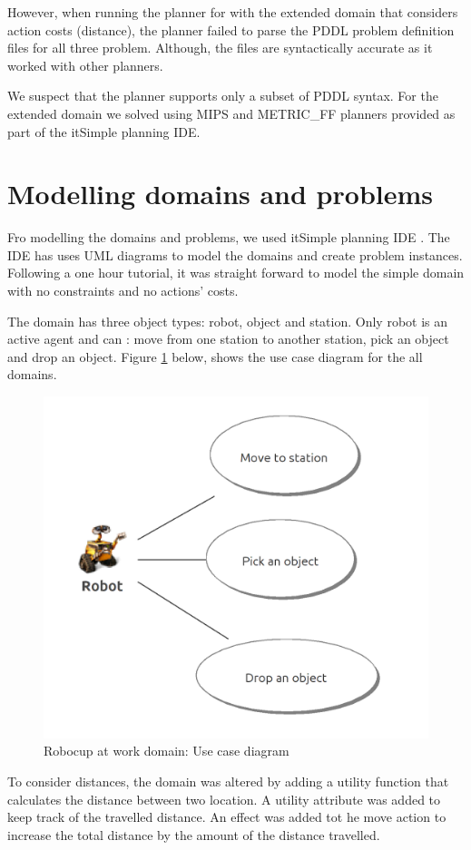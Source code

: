 \documentclass{article}
\begin{document}
However, when running the planner for with the extended domain that considers action costs (distance), the planner failed to parse the PDDL problem definition files for all three problem. Although, the files are syntactically accurate as it worked with other planners. 

We suspect that the planner supports only a subset of PDDL syntax. For the extended domain we solved using MIPS and METRIC\_FF planners provided as part of the itSimple planning IDE.
\section{Modelling domains and problems}
Fro modelling the domains and problems, we used itSimple planning IDE \cite{itsimple}. The IDE has uses UML diagrams to model the domains and create problem instances. Following a one hour tutorial, it was straight forward to model the simple domain with no constraints and no actions' costs.

The domain has three object types: robot, object and station. Only robot is an active agent and can : move from one station to another station, pick an object and drop an object. Figure \ref{fig:usecase} below, shows the use case diagram for the all domains.

\begin{figure}[h] %
	\centering
	\includegraphics[width=8 cm]{figures/use_case_diagram.png} 
	\caption{Robocup at work domain: Use case diagram}
	\label{fig:usecase}
\end{figure}

To consider distances, the domain was altered by adding a utility function that calculates the distance between two location. A utility attribute was added to keep track of the travelled distance. An effect was added tot he move action to increase the total distance by the amount of the distance travelled.
\end{document}
